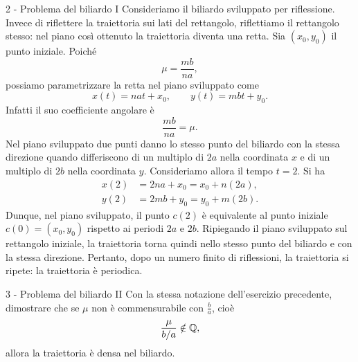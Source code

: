 \documentclass[a4paper]{article}
\begin{document}
\begin{snippetsolution}{2 - Problema del biliardo I}
    Consideriamo il biliardo sviluppato per riflessione. Invece di riflettere la traiettoria sui lati del rettangolo, riflettiamo il rettangolo stesso: nel piano così ottenuto la traiettoria diventa una retta.
    Sia \((x_0,y_0)\) il punto iniziale. Poiché
    \[
        \mu=\frac{mb}{na},
    \]
    possiamo parametrizzare la retta nel piano sviluppato come
    \[
        x(t)=nat+x_0,
        \qquad
        y(t)=mbt+y_0.
    \]
    Infatti il suo coefficiente angolare è
    \[
        \frac{mb}{na}=\mu.
    \]
    Nel piano sviluppato due punti danno lo stesso punto del biliardo con la stessa direzione quando differiscono di un multiplo di \(2a\) nella coordinata \(x\) e di un multiplo di \(2b\) nella coordinata \(y\). Consideriamo allora il tempo \(t=2\). Si ha
    \begin{align*}
        x(2)&=2na+x_0=x_0+n(2a),\\
        y(2)&=2mb+y_0=y_0+m(2b).
    \end{align*}
    Dunque, nel piano sviluppato, il punto \(c(2)\) è equivalente al punto iniziale \(c(0)=(x_0,y_0)\) rispetto ai periodi \(2a\) e \(2b\). Ripiegando il piano sviluppato sul rettangolo iniziale, la traiettoria torna quindi nello stesso punto del biliardo e con la stessa direzione.
    Pertanto, dopo un numero finito di riflessioni, la traiettoria si ripete: la traiettoria è periodica.
\end{snippetsolution}

\begin{snippetexercise}{3 - Problema del biliardo II}
    Con la stessa notazione dell'esercizio precedente, dimostrare che
    se \(\mu\) non è commensurabile con \(\frac{b}{a}\), cioè
    \[
        \frac{\mu}{b/a}\notin\mathbb{Q},
    \]
    allora la traiettoria è densa nel biliardo.
\end{snippetexercise}
\end{document}
